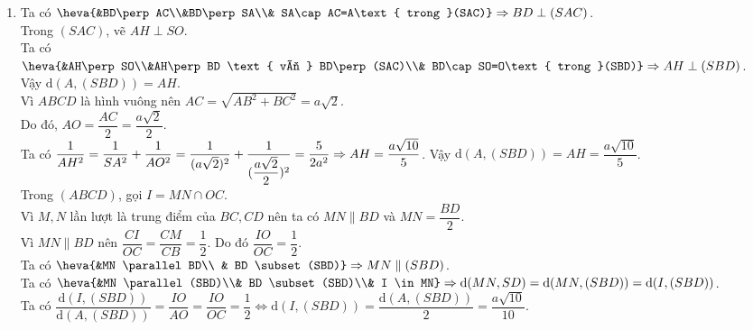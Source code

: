 \begin{bt}
{\begin{enumerate}
			Ta có $AC=a\sqrt{2}$ nên tam giác $SAC$ vuông cân tại $A$, do đó $\widehat{SCA}=45^\circ$.
			\item Ta có $\heva{&BD\perp AC\\&BD\perp SA\\& SA\cap AC=A\text{ trong }(SAC)}\Rightarrow BD \perp (SAC)$.\\ 
			Trong $(SAC)$, vẽ $AH \perp SO$.\\
			Ta có $\heva{&AH\perp SO\\&AH\perp BD \text{ vì } BD\perp (SAC)\\& BD\cap SO=O\text{ trong }(SBD)}\Rightarrow AH \perp (SBD)$.\\
			Vậy $\mathrm{d}(A,(SBD))=AH$.\\
			Vì $ABCD$ là hình vuông nên $AC=\sqrt{AB^2+BC^2}=a\sqrt{2}$.\\
			 Do đó, $AO=\dfrac{AC}{2}=\dfrac{a\sqrt{2}}{2}$.\\
			 Ta có $\dfrac{1}{AH^2}=\dfrac{1}{SA^2}+\dfrac{1}{AO^2}=\dfrac{1}{(a\sqrt{2})^2}+\dfrac{1}{(\dfrac{a\sqrt{2}}{2})^2}=\dfrac{5}{2a^2}\\
			 \Rightarrow AH=\dfrac{a\sqrt{10}}{5}$. Vậy $\mathrm{d}(A,(SBD))=AH=\dfrac{a\sqrt{10}}{5}$.\\
			Trong $(ABCD)$, gọi $I=MN\cap OC$.\\
			Vì $M,N$ lần lượt là trung điểm của $BC,CD$ nên ta có $MN \parallel BD$ và $MN=\dfrac{BD}{2}$.\\
			Vì $MN \parallel BD$ nên $\dfrac{CI}{OC}=\dfrac{CM}{CB}=\dfrac{1}{2}$. Do đó $\dfrac{IO}{OC}=\dfrac{1}{2}$.\\
			Ta có $\heva{&MN \parallel BD\\ & BD \subset (SBD)}\Rightarrow MN \parallel (SBD)$.\\
			Ta có $\heva{&MN \parallel (SBD)\\& BD \subset (SBD)\\& I \in MN}\Rightarrow \mathrm{d}(MN,SD)=\mathrm{d}(MN,(SBD))=\mathrm{d}(I,(SBD))$.\\
			Ta có $\dfrac{\mathrm{d}(I,(SBD))}{\mathrm{d}(A,(SBD))}=\dfrac{IO}{AO}=\dfrac{IO}{OC}=\dfrac{1}{2} \Leftrightarrow \mathrm{d}(I,(SBD))=\dfrac{\mathrm{d}(A,(SBD))}{2}=\dfrac{a\sqrt{10}}{10}$.\\
		\end{enumerate}
	}
\end{bt}

